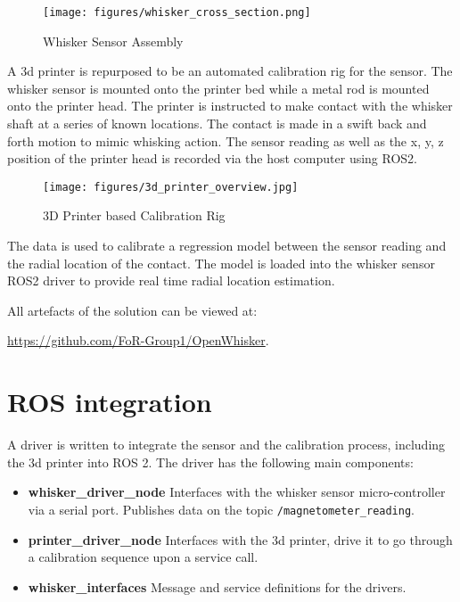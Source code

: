 \documentclass{article}
\begin{document}
\begin{figure}[h]
    \centering
    \texttt{[image: figures/whisker\_cross\_section.png]}
    \caption{Whisker Sensor Assembly}
    \label{fig:whisker_sensor}
\end{figure}

A 3d printer is repurposed to be an automated calibration rig for the sensor. The whisker sensor is mounted onto the printer bed while a metal rod is mounted onto the printer head. The printer is instructed to make contact with the whisker shaft at a series of known locations. The contact is made in a swift back and forth motion to mimic whisking action. The sensor reading as well as the x, y, z position of the printer head is recorded via the host computer using ROS2.

\begin{figure}[h]
    \centering
    \texttt{[image: figures/3d\_printer\_overview.jpg]}
    \caption{3D Printer based Calibration Rig}
    \label{fig:whisker_sensor}
\end{figure}

The data is used to calibrate a regression model between the sensor reading and the radial location of the contact. The model is loaded into the whisker sensor ROS2 driver to provide real time radial location estimation.

All artefacts of the solution can be viewed at:

\url{https://github.com/FoR-Group1/OpenWhisker}.

\vspace{20px}


\section{ROS integration}

A driver is written to integrate the sensor and the calibration process, including the 3d printer into ROS 2. The driver has the following main components:

\begin{itemize}
    \item \textbf{whisker\_driver\_node} Interfaces with the whisker sensor micro-controller via a serial port. Publishes data on the topic \verb|/magnetometer_reading|.
    \item  \textbf{printer\_driver\_node} Interfaces with the 3d printer, drive it to go through a calibration sequence upon a service call.
    \item \textbf{whisker\_interfaces} Message and service definitions for the drivers.
\end{itemize}
\end{document}
